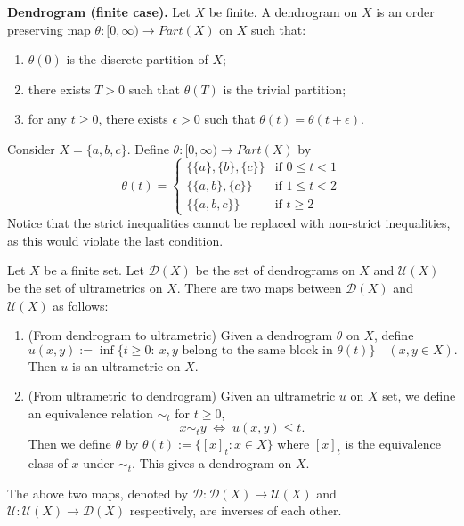 \begin{definition}
  \textbf{Dendrogram (finite case).}
  Let $X$ be finite. A dendrogram on $X$ is an order preserving map $\theta:[0,\infty)\to Part(X)$ on $X$ such that:
  \begin{enumerate}
    \item $\theta(0)$ is the discrete partition of $X$;
    \item there exists $T>0$ such that $\theta(T)$ is the trivial partition;
    \item for any $t\geq 0$, there exists $\epsilon>0$ such that $\theta(t)=\theta(t+\epsilon)$.
  \end{enumerate}
\end{definition}
\begin{example}
  Consider $X=\{a,b,c\}$. Define $\theta:[0,\infty)\to Part(X)$ by
  \[
  \theta(t) =
  \begin{cases}
    \{\{a\},\{b\},\{c\}\} & \text{if } 0\le t<1 \\
    \{\{a,b\},\{c\}\} & \text{if } 1\le t<2 \\
    \{\{a,b,c\}\} & \text{if } t\ge 2
  \end{cases}
  \]
  Notice that the strict inequalities cannot be replaced with non-strict inequalities, as this would violate the last condition.
\end{example}



\begin{theorem}
Let $X$ be a finite set. Let $\mathcal{D}(X)$ be the set of dendrograms on $X$ and $\mathcal{U}(X)$ be the set of ultrametrics on $X$. There are two maps between $\mathcal{D}(X)$ and $\mathcal{U}(X)$ as follows:
\begin{enumerate}
  \item (From dendrogram to ultrametric) Given a dendrogram $\theta$ on $X$, define
  \[
    u(x,y):=\inf\{t\ge 0:\ x, y \text{ belong to the same block in }\theta(t)\}\quad (x,y\in X).
  \]
  Then $u$ is an ultrametric on $X$.
  \item (From ultrametric to dendrogram) Given an ultrametric $u$ on $X$ set, we define an equivalence relation $\sim_t$ for $t\ge 0$,
  \[
    x\sim_t y \;\Longleftrightarrow\; u(x,y)\le t.
  \]
  Then we define $\theta$ by $\theta(t):=\{[x]_t:x\in X\}$ where $[x]_t$ is the equivalence class of $x$ under $\sim_t$. This gives a dendrogram on $X$.
\end{enumerate}
The above two maps, denoted by $\mathcal{D}: \mathcal{D}(X) \to \mathcal{U}(X)$ and $\mathcal{U}: \mathcal{U}(X) \to \mathcal{D}(X)$ respectively, are inverses of each other.
\end{theorem}

